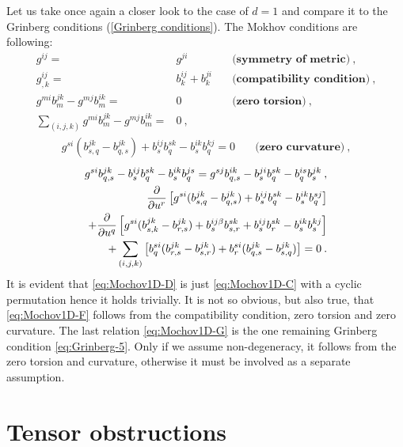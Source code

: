\begin{remark}
    Let us take once again a closer look to the case of $d=1$ and compare it to the Grinberg conditions (\vref{Grinberg conditions}). The Mokhov conditions are following:
    \begin{align}
        g^{ij} =& g^{ji} \quad &\textbf{(symmetry of metric)} \:, \label{eq:Mochov1D-A}\\
        g^{ij}_{,k} =& b^{ij}_k + b^{ji}_k \quad &\textbf{(compatibility condition)} \label{eq:Mochov1D-B}\:, \\
        g^{mi} b^{jk}_m - g^{mj} b^{ik}_m =& 0 \quad &\textbf{(zero torsion)} \:, \label{eq:Mochov1D-C}\\
        \sum_{(i,j,k)} g^{mi} b^{jk}_m - g^{mj} b^{ik}_m =& 0 \:,\quad& \label{eq:Mochov1D-D}
    \end{align}
    \begin{align}
        g^{si} (b^{jk}_{s,q} - b^{jk}_{q,s}) + b^{ij}_s b^{sk}_q - b^{ik}_s b^{kj}_q = 0 \quad &\textbf{(zero curvature)}\:, \label{eq:Mochov1D-E}
    \end{align}
    \begin{align}
        g^{si} b^{j k}_{q,s} - b^{ij}_s b^{s k}_q - b^{i k}_s b^{j s}_q = g^{s j } b^{i k}_{q,s} - b^{ji}_s b^{s k}_q - b^{is}_q b^{jk}_s \:, \label{eq:Mochov1D-F}\\
        \frac{\partial }{\partial u^r} \left[ g^{si} (b^{j k }_{s,q} - b^{j k}_{q,s}) + b^{ij}_s b^{s k}_q - b^{i k}_s b^{s j}_q \right] 
        \nonumber \\+ \frac{\partial }{\partial u^q} \left[ g^{si } (b^{j k}_{s,k} - b^{j k}_{r,s}) + b^{ij \beta}_s b^{s k}_{s,r} + b^{ij}_s b^{s k}_r - b^{ik}_s b^{kj}_s \right] \label{eq:Mochov1D-G}
        \\+ \sum_{(i,j,k)} \left[ b^{si}_q (b^{j k}_{r,s} - b^{j k}_{s,r}) + b^{s i}_r (b^{j k}_{q,s} - b^{j k}_{s,q}) \right] \nonumber
        = 0 \:.
    \end{align}
    It is evident that \eqref{eq:Mochov1D-D} is just \eqref{eq:Mochov1D-C} with a cyclic permutation hence it holds trivially. It is not so obvious, but also true, that \eqref{eq:Mochov1D-F} follows from the compatibility condition, zero torsion and zero curvature. 
     The last relation \eqref{eq:Mochov1D-G} is the one remaining Grinberg condition \eqref{eq:Grinberg-5}. Only if we assume non-degeneracy, it follows from the zero torsion and curvature, otherwise it must be involved as a separate assumption.
\end{remark}


\section{Tensor obstructions}

